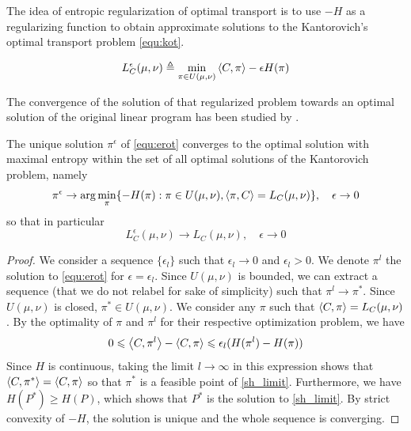 The idea of entropic regularization of optimal transport is to use $-H$ as a regularizing function to obtain approximate solutions to the Kantorovich's optimal transport problem \ref{equ:kot}. 

\begin{equation}
\label{equ:erot}
L^\epsilon_C(\mu,\nu)\triangleq \min\limits_{\pi\in U(\mu, \nu)}\left\langle C,\pi\right\rangle-\epsilon H(\pi)
\end{equation}

The convergence of the solution of that regularized problem towards an optimal solution of the original linear program has been studied by \cite{aaote}. 
\begin{proposition}
\label{sh_cvg}
The unique solution $\pi^\epsilon$ of \ref{equ:erot} converges to the optimal solution with maximal entropy within the set of all optimal solutions of the Kantorovich problem, namely
\begin{equation}
\label{sh_limit}
\pi^\epsilon\to\arg\min\limits_\pi\{-H(\pi): \pi\in U(\mu,\nu), \left\langle\pi, C\right\rangle=L_C(\mu,\nu)\}, \quad \epsilon\to0
\end{equation}
so that in particular
$$
L^\epsilon_C(\mu,\nu)\to L_C(\mu,\nu), \quad \epsilon\to0
$$
\end{proposition}
\begin{proof}
We consider a sequence $\{\epsilon_l\}$ such that $\epsilon_l\to0$ and $\epsilon_l>0$. We denote $\pi^l$ the solution to \ref{equ:erot} for $\epsilon=\epsilon_l$. Since $U(\mu,\nu)$ is bounded, we can extract a sequence (that we do not relabel for sake of simplicity) such that $\pi^l\to\pi^*$. Since $U(\mu, \nu)$ is closed, $\pi^*\in U(\mu,\nu)$. We consider any $\pi$ such that $\left\langle C,\pi\right\rangle=L_C(\mu,\nu)$. By the optimality of $\pi$ and $\pi^l$ for their respective optimization problem, we have
\begin{equation}
0\leqslant\left\langle C, \pi^l\right\rangle-\left\langle C, \pi\right\rangle\leqslant\epsilon_l(H(\pi^l)-H(\pi))
\end{equation}
Since $H$ is continuous, taking the limit $l\to\infty$ in this expression shows that $\left\langle C, \pi^*\right\rangle=\left\langle C, \pi\right\rangle$ so that $\pi^*$ is a feasible point of \ref{sh_limit}. Furthermore, we have $H(P^*)\geqslant H(P)$, which shows that $P^*$ is the solution to \ref{sh_limit}. By strict convexity of $-H$, the solution is unique and the whole sequence is converging. 
\end{proof}

